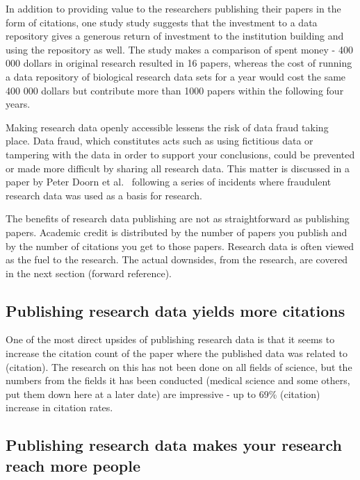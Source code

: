In addition to providing value to the researchers publishing their papers in
the form of citations, one study \cite{piwowar2011data} study suggests that
the investment to a data repository gives a generous return of investment to
the institution building and using the repository as well. The study makes a
comparison of spent money - 400 000 dollars in original research resulted in
16 papers, whereas the cost of running a data repository of biological research
data sets for a year would cost the same 400 000 dollars but contribute more
than 1000 papers within the following four years.

Making research data openly accessible lessens the risk of data fraud taking
place. Data fraud, which constitutes acts such as using fictitious data or
tampering with the data in order to support your conclusions, could be
prevented or made more difficult by sharing all research data. This matter is
discussed in a paper by Peter Doorn et al.{\ }\cite{DBLP:journals/ijdc/DoornDH13}
following a series of incidents where fraudulent research data was used as a
basis for research.

\iffalse

The benefits of research data publishing are not as straightforward as
publishing papers. Academic credit is distributed by the number of papers you
publish and by the number of citations you get to those papers. Research data
is often viewed as the fuel to the research. The actual downsides, from the
research, are covered in the next section (forward reference).

\subsection{Publishing research data yields more citations}

One of the most direct upsides of publishing research data is that it seems to
increase the citation count of the paper where the published data was related
to (citation). The research on this has not been done on all fields of science,
but the numbers from the fields it has been conducted (medical science and
some others, put them down here at a later date) are impressive - up to
69\% (citation) increase in citation rates.

\subsection{Publishing research data makes your research reach more people}

